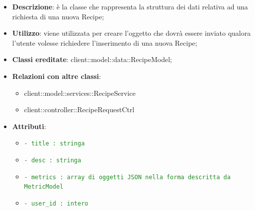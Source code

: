			\begin{itemize}
				\item \textbf{Descrizione}: è la classe che rappresenta la struttura dei dati relativa ad una richiesta di una nuova Recipe;
				\item \textbf{Utilizzo}: viene utilizzata per creare l'oggetto che dovrà essere inviato qualora l'utente volesse richiedere l'inserimento di una nuova Recipe;
				\item \textbf{Classi ereditate}: client::model::data::RecipeModel;
				\item \textbf{Relazioni con altre classi}:
					\begin{itemize}
						\item client::model::services::RecipeService
						\item client::controller::RecipeRequestCtrl
					\end{itemize}
				\item \textbf{Attributi}:
					\begin{itemize}
						\item \textcolor{forestgreen}{\texttt{- title : stringa}}
						\item \textcolor{forestgreen}{\texttt{- desc : stringa}}
						\item \textcolor{forestgreen}{\texttt{- metrics : array di oggetti JSON nella forma descritta da MetricModel}}
						\item \textcolor{forestgreen}{\texttt{- user\_id : intero}}
					\end{itemize}
			\end{itemize}

